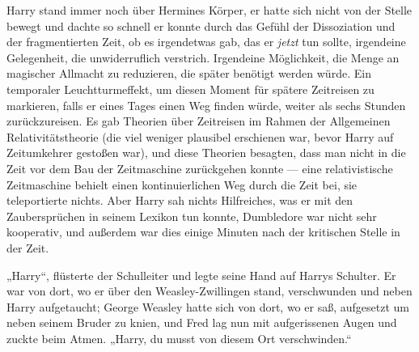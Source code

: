 Harry stand immer noch über Hermines Körper, er hatte sich nicht von der Stelle bewegt und dachte so schnell er konnte durch das Gefühl der Dissoziation und der fragmentierten Zeit, ob es irgendetwas gab, das er \emph{jetzt} tun sollte, irgendeine Gelegenheit, die unwiderruflich verstrich. Irgendeine Möglichkeit, die Menge an magischer Allmacht zu reduzieren, die später benötigt werden würde. Ein temporaler Leuchtturmeffekt, um diesen Moment für spätere Zeitreisen zu markieren, falls er eines Tages einen Weg finden würde, weiter als sechs Stunden zurückzureisen. Es gab Theorien über Zeitreisen im Rahmen der Allgemeinen Relativitätstheorie (die viel weniger plausibel erschienen war, bevor Harry auf Zeitumkehrer gestoßen war), und diese Theorien besagten, dass man nicht in die Zeit vor dem Bau der Zeitmaschine zurückgehen konnte — eine relativistische Zeitmaschine behielt einen kontinuierlichen Weg durch die Zeit bei, sie teleportierte nichts. Aber Harry sah nichts Hilfreiches, was er mit den Zaubersprüchen in seinem Lexikon tun konnte, Dumbledore war nicht sehr kooperativ, und außerdem war dies einige Minuten nach der kritischen Stelle in der Zeit.

„Harry“, flüsterte der Schulleiter und legte seine Hand auf Harrys Schulter. Er war von dort, wo er über den Weasley-Zwillingen stand, verschwunden und neben Harry aufgetaucht; George Weasley hatte sich von dort, wo er saß, aufgesetzt um neben seinem Bruder zu knien, und Fred lag nun mit aufgerissenen Augen und zuckte beim Atmen.
„Harry, du musst von diesem Ort verschwinden.“

